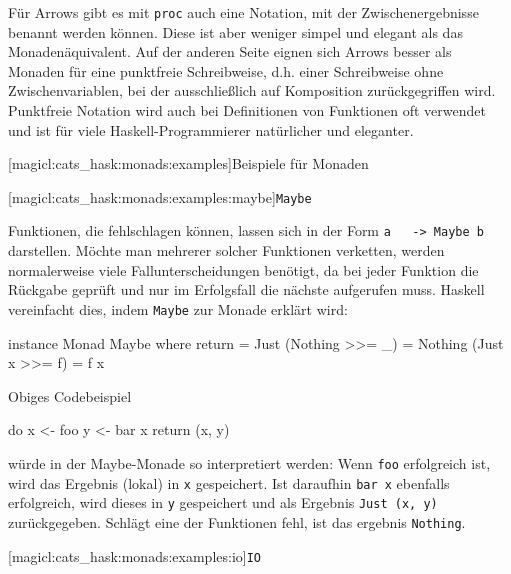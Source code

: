 \documentclass[a4paper, bibgerm]{book}
\newcommand\icode[1]{\lstinline?#1?}
\newcommand\lsubsubsection{}
\newcommand\lparagraph{}
\begin{document}
Für Arrows gibt es mit \icode{proc} auch eine Notation, mit der
Zwischenergebnisse benannt werden können. Diese ist aber weniger simpel
und elegant als das Monadenäquivalent. Auf der anderen Seite eignen sich
Arrows besser als Monaden für eine punktfreie Schreibweise, d.h. einer
Schreibweise ohne Zwischenvariablen, bei der ausschließlich auf
Komposition zurückgegriffen wird. Punktfreie Notation wird auch bei
Definitionen von Funktionen oft verwendet und ist für viele
Haskell-Programmierer natürlicher und eleganter.

\lsubsubsection[magicl:cats_hask:monads:examples]{Beispiele für Monaden}

\lparagraph[magicl:cats_hask:monads:examples:maybe]{\icode{Maybe}}

Funktionen, die fehlschlagen können, lassen sich in der Form \icode{a
  -> Maybe b} darstellen. Möchte man mehrerer solcher Funktionen
verketten, werden normalerweise viele Fallunterscheidungen benötigt, da
bei jeder Funktion die Rückgabe geprüft und nur im Erfolgsfall die
nächste aufgerufen muss. Haskell vereinfacht dies, indem \icode{Maybe}
zur Monade erklärt wird:
\begin{code}
instance Monad Maybe
  where return = Just
        (Nothing >>= _) = Nothing
        (Just x  >>= f) = f x
\end{code} %
Obiges Codebeispiel
\begin{code}
do x <- foo
   y <- bar x
   return (x, y)
\end{code}
würde in der Maybe-Monade so interpretiert werden: Wenn \icode{foo}
erfolgreich ist, wird das Ergebnis (lokal) in \icode{x} gespeichert. Ist
daraufhin \icode{bar x} ebenfalls erfolgreich, wird dieses in \icode{y}
gespeichert und als Ergebnis \icode{Just (x, y)} zurückgegeben. Schlägt
eine der Funktionen fehl, ist das ergebnis \icode{Nothing}.

\lparagraph[magicl:cats_hask:monads:examples:io]{\icode{IO}}
\end{document}
